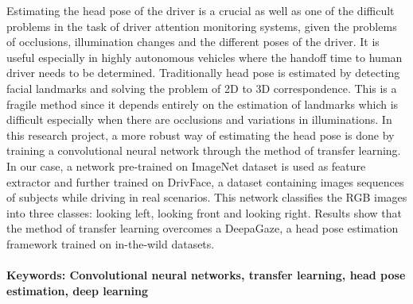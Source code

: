 \documentclass[a4paper, 12pt, oneside, BCOR1cm,toc=chapterentrywithdots]{scrbook}
\renewcommand*{\tableofcontents}{%
  	\begingroup
  	\tocsection
  	\tocfile{\contentsname}{toc}
  	\endgroup
}
\renewcommand*{\listoffigures}{%
  	\begingroup
  	\tocsection
  	\tocfile{\listfigurename}{lof}
  	\endgroup
}
\renewcommand{\listoftables}{
	\begingroup
	\tocsection
	\tocfile{\listtablename}{lot}
	\endgroup
}
\begin{document}

Estimating the head pose of the driver is a crucial as well as one of the difficult problems in the task of driver attention monitoring systems, given the problems of occlusions, illumination changes and the different poses of the driver. It is useful especially in highly autonomous vehicles where the handoff time to human driver needs to be determined. Traditionally head pose is estimated by detecting facial landmarks and solving the problem of 2D to 3D correspondence. This is a fragile method since it depends entirely on the estimation of landmarks which is difficult especially when there are occlusions and variations in illuminations. In this research project, a more robust way of estimating the head pose is done by training a convolutional neural network through the method of transfer learning. In our case, a network pre-trained on ImageNet dataset is used as feature extractor and further trained on DrivFace, a dataset containing images sequences of subjects while driving in real scenarios. This network classifies the RGB images into three classes: looking left, looking front and looking right. Results show that the method of transfer learning overcomes a DeepaGaze, a head pose estimation framework trained on in-the-wild datasets.
\\\\
\textbf{Keywords: Convolutional neural networks, transfer learning, head pose estimation, deep learning}


\tableofcontents
\listoffigures
\listoftables
\end{document}
